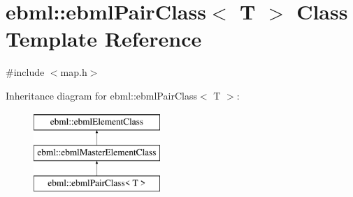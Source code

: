 \hypertarget{classebml_1_1ebmlPairClass}{}\section{ebml\+:\+:ebml\+Pair\+Class$<$ T $>$ Class Template Reference}
\label{classebml_1_1ebmlPairClass}


{\ttfamily \#include $<$map.\+h$>$}

Inheritance diagram for ebml\+:\+:ebml\+Pair\+Class$<$ T $>$\+:\begin{figure}[H]
\begin{center}
\leavevmode
\includegraphics[height=3.000000cm]{classebml_1_1ebmlPairClass}
\end{center}
\end{figure}
